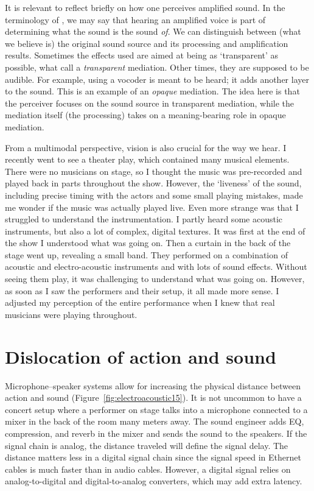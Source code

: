 It is relevant to reflect briefly on how one perceives amplified sound. In the terminology of \citet{clarke_ways_2005}, we may say that hearing an amplified voice is part of determining what the sound is the sound \emph{of}. We can distinguish between (what we believe is) the original sound source and its processing and amplification results. Sometimes the effects used are aimed at being as `transparent' as possible, what \citet{brovig-hanssen_listening_2018} call a \emph{transparent} mediation. Other times, they are supposed to be audible. For example, using a vocoder is meant to be heard; it adds another layer to the sound. This is an example of an \emph{opaque} mediation. The idea here is that the perceiver focuses on the sound source in transparent mediation, while the mediation itself (the processing) takes on a meaning-bearing role in opaque mediation.

From a multimodal perspective, vision is also crucial for the way we hear. I recently went to see a theater play, which contained many musical elements. There were no musicians on stage, so I thought the music was pre-recorded and played back in parts throughout the show. However, the `liveness' of the sound, including precise timing with the actors and some small playing mistakes, made me wonder if the music was actually played live. Even more strange was that I struggled to understand the instrumentation. I partly heard some acoustic instruments, but also a lot of complex, digital textures. It was first at the end of the show I understood what was going on. Then a curtain in the back of the stage went up, revealing a small band. They performed on a combination of acoustic and electro-acoustic instruments and with lots of sound effects. Without seeing them play, it was challenging to understand what was going on. However, as soon as I saw the performers and their setup, it all made more sense. I adjusted my perception of the entire performance when I knew that real musicians were playing throughout.


\section{Dislocation of action and sound}

Microphone--speaker systems allow for increasing the physical distance between action and sound (Figure~\ref{fig:electroacoustic15}). It is not uncommon to have a concert setup where a performer on stage talks into a microphone connected to a mixer in the back of the room many meters away. The sound engineer adds EQ, compression, and reverb in the mixer and sends the sound to the speakers. If the signal chain is analog, the distance traveled will define the signal delay. The distance matters less in a digital signal chain since the signal speed in Ethernet cables is much faster than in audio cables. However, a digital signal relies on analog-to-digital and digital-to-analog converters, which may add extra latency.

